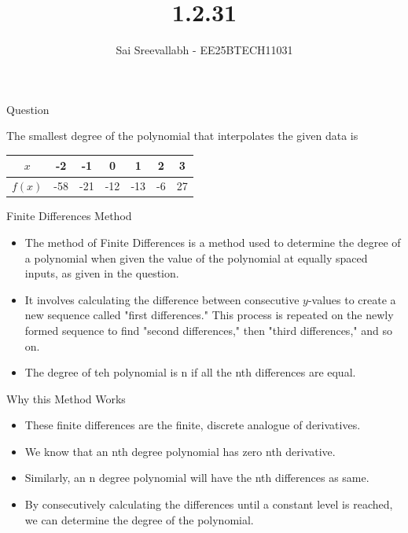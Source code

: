 \documentclass{beamer}
\title 
{1.2.31}
\date{}
\author 
{Sai Sreevallabh - EE25BTECH11031}
\begin{document}
\frame{\titlepage}

\begin{frame}{Question}

The smallest degree of the polynomial that interpolates the given data is
\begin{center}
\begin{tabular}{|c|c|c|c|c|c|c|}
\hline
$x$ & -2 & -1 & 0 & 1 & 2 & 3 \\
\hline
$f(x)$ & -58 & -21 & -12 & -13 & -6 & 27 \\
\hline
\end{tabular}
\end{center}
    
\end{frame}

\begin{frame}{Finite Differences Method}

\begin{itemize}
    \item The method of Finite Differences is a method used to determine the degree of a polynomial when given the value of the polynomial at equally spaced inputs, as given in the question. 
    \item It involves calculating the difference between consecutive $y$-values to create a new sequence called "first differences." This process is repeated on the newly formed sequence to find "second differences," then "third differences," and so on.
    \item The degree of teh polynomial is n if all the nth differences are equal. 
\end{itemize}

\end{frame}

\begin{frame}{Why this Method Works}

\begin{itemize}
    \item These finite differences are the finite, discrete analogue of derivatives.  
    \item We know that an nth degree polynomial has zero nth derivative.
    \item Similarly, an n degree polynomial will have the nth differences as same. 
    \item By consecutively calculating the differences until a constant level is reached, we can determine the degree of the polynomial. 
\end{itemize}
    
\end{frame}
\end{document}
